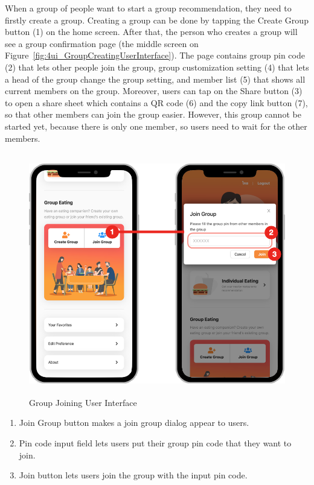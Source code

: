 \documentclass[12pt,oneside,openright,a4paper]{cpe-english-project}
\begin{document}
When a group of people want to start a group recommendation, they need to firstly create a group. Creating a group can be done by tapping the Create Group button (1) on the home screen. After that, the person who creates a group will see a group confirmation page (the middle screen on Figure~\ref{fig:4ui_GroupCreatingUserInterface}). The page contains group pin code (2) that lets other people join the group, group customization setting (4) that lets a head of the group change the group setting, and member list (5) that shows all current members on the group. Moreover, users can tap on the Share button (3) to open a share sheet which contains a QR code (6) and the copy link button (7), so that other members can join the group easier. However, this group cannot be started yet, because there is only one member, so users need to wait for the other members.
\begin{figure}[H]\centering
\includegraphics[height=300pt]{./images/4ui_GroupJoiningUserInterface.png}
\caption{Group Joining User Interface}\label{fig:4ui_GroupJoiningUserInterface}
\end{figure}\vspace{-24pt}

\begin{enumerate}
\item Join Group button makes a join group dialog appear to users.
\item Pin code input field lets users put their group pin code that they want to join.
\item Join button lets users join the group with the input pin code.
\end{enumerate}
\end{document}
